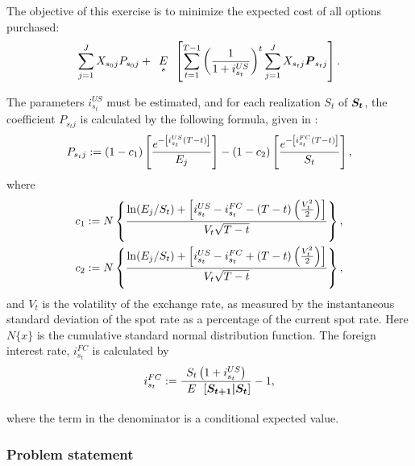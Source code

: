 The objective of this exercise is to minimize the expected cost of all options purchased:
\begin{equation*}
\sum_{j=1}^J X_{s_0 j} P_{s_0 j} + \expect[s]\left[\sum_{t=1}^{T-1}\left(\frac{1}{1+i^{US}_{s_t}}\right)^t \sum_{j=1}^J X_{s_t j} \rand{P}_{s_t j} \right].
\end{equation*}

The parameters $i^{US}_{s_t}$ must be estimated, and for each realization $S_t$ of $\mathbf{\boldsymbol{S_t}}$, the coefficient $P_{s_t j}$ is calculated by the following formula, given in \cite{klaassen90}:
\begin{equation}
\label{HEDGE:price}
P_{s_t j}:= (1-c_1)\left[ \frac{e^{-\left[i^{US}_{s_t} (T-t)\right]}}{E_j}\right] - (1-c_2)\left[\frac{e^{-\left[i^{FC}_{s_t} (T-t)\right]}}{S_t}\right],
\end{equation}
where
\begin{eqnarray*}
c_1 := N\left\{ \frac{\ln (E_j/S_t) + \left[i^{US}_{s_t} - i^{FC}_{s_t} - (T-t)\left(\frac{V_t^2}{2}\right)\right]}{V_t \sqrt{T-t}}\right\},\\
c_2 := N\left\{ \frac{\ln (E_j/S_t) + \left[i^{US}_{s_t} - i^{FC}_{s_t} + (T-t)\left(\frac{V_t^2}{2}\right)\right]}{V_t \sqrt{T-t}}\right\},
\end{eqnarray*}
and $V_t$ is the volatility of the exchange rate, as measured by the instantaneous standard deviation of the spot rate as a percentage of the current spot rate.  Here $N\{x\}$ is the cumulative standard normal distribution function.  The foreign interest rate, $i^{FC}_{s_t}$ is calculated by 
\begin{equation*}
i^{FC}_{s_t} \assign \frac{S_t \left(1+ i^{US}_{s_t}\right)}{\expect[] \left[\rand{S_{t+1}|S_t}\right]} - 1,
\end{equation*}
where the term in the denominator is a conditional expected value.





\subsubsection{Problem statement}

